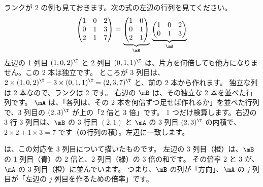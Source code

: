 ランクが 2 の例も見ておきます。次の式の左辺の行列を見てください。
\[
\begin{pmatrix}1&0&2\\0&1&3\\2&1&7\end{pmatrix}
=\underbrace{\begin{pmatrix}1&0\\0&1\\2&1\end{pmatrix}}_{\mB}\,
\underbrace{\begin{pmatrix}1&0&2\\0&1&3\end{pmatrix}}_{\mA}
\]
左辺の 1 列目 $(1,0,2)^\T$ と 2 列目 $(0,1,1)^\T$ は、片方を何倍しても他方になりません。この 2 本は独立です。
ところが 3 列目は、$2\times(1,0,2)^\T+3\times(0,1,1)^\T=(2,3,7)^\T$ と、前の 2 本から作れます。
独立な列は 2 本なので、ランクは 2 です。
右辺の $\mB$ は、その独立な 2 本を並べた行列です。
$\mA$ は、「各列は、その 2 本を何倍ずつ足せば作れるか」を並べた行列で、3 列目の $(2,3)^\T$ が上の「2 倍と 3 倍」です。
1 つだけ検算します。右辺の 3 行 3 列目は、$\mB$ の 3 行目 $(2,1)$ と $\mA$ の 3 列目 $(2,3)^\T$ の内積で、$2\times2+1\times3=7$ です（の行列の積）。左辺に一致します。

は、この対応を 3 列目について描いたものです。
左辺の 3 列目（橙）は、$\mB$ の 1 列目（青）の 2 倍と、2 列目（緑）の 3 倍の和です。
その倍率 2 と 3 が、$\mA$ の 3 列目（橙）に並んでいます。
つまり、$\mB$ の列が「方向」、$\mA$ の $j$ 列目が「左辺の $j$ 列目を作るための倍率」です。

